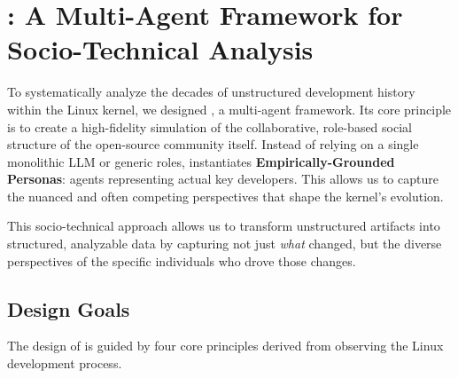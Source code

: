 
\section{\sys: A Multi-Agent Framework for Socio-Technical Analysis}

To systematically analyze the decades of unstructured development history within the Linux kernel, we designed \sys, a multi-agent framework. Its core principle is to create a high-fidelity simulation of the collaborative, role-based social structure of the open-source community itself. Instead of relying on a single monolithic LLM or generic roles, \sys instantiates \textbf{Empirically-Grounded Personas}: agents representing actual key developers. This allows us to capture the nuanced and often competing perspectives that shape the kernel's evolution.

This socio-technical approach allows us to transform unstructured artifacts into structured, analyzable data by capturing not just \emph{what} changed, but the diverse perspectives of the specific individuals who drove those changes.

\subsection{Design Goals}

The design of \sys is guided by four core principles derived from observing the Linux development process.


